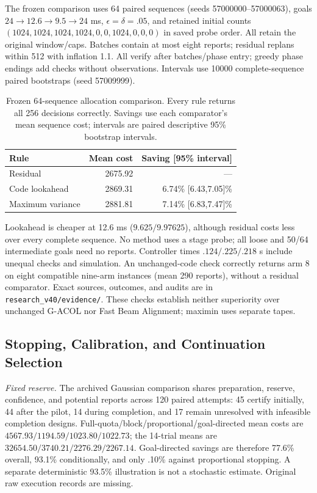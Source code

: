 The frozen comparison uses 64 paired sequences (seeds 57000000--57000063), goals $24\to12.6\to9.5\to24$ ms, $\epsilon=\delta=.05$, and retained initial counts $(1024,1024,1024,1024,0,0,1024,0,0,0)$ in saved probe order. All retain the original window/caps. Batches contain at most eight reports; residual replans within 512 with inflation 1.1. All verify after batches/phase entry; greedy phase endings add checks without observations. Intervals use 10000 complete-sequence paired bootstraps (seed 57009999).

\begin{table}[t]
\centering\small
\caption{Frozen 64-sequence allocation comparison. Every rule returns all 256 decisions correctly. Savings use each comparator's mean sequence cost; intervals are paired descriptive 95\% bootstrap intervals.}
\label{tab:allocation-replication-cost}
\label{tab:allocation-replication-savings}
\setlength{\tabcolsep}{3pt}
\begin{tabular}{@{}lrr@{}}
\toprule
Rule & Mean cost & Saving [95\% interval]\\
\midrule
Residual &2675.92&---\\
Code lookahead &2869.31&6.74\% [6.43,7.05]\%\\
Maximum variance &2881.81&7.14\% [6.83,7.47]\%\\
\bottomrule
\end{tabular}
\end{table}
Lookahead is cheaper at 12.6 ms ($9.625/9.97625$), although residual costs less over every complete sequence. No method uses a stage probe; all loose and 50/64 intermediate goals need no reports. Controller times $.124/.225/.218$ s include unequal checks and simulation. An unchanged-code check correctly returns arm 8 on eight compatible nine-arm instances (mean 290 reports), without a residual comparator. Exact sources, outcomes, and audits are in \texttt{research\_v40/evidence/}. These checks establish neither superiority over unchanged G-ACOL nor Fast Beam Alignment; maximin uses separate tapes.

\subsection{Stopping, Calibration, and Continuation Selection}
\label{app:execution-saving}
\emph{Fixed reserve.} The archived Gaussian comparison shares preparation, reserve, confidence, and potential reports across 120 paired attempts: 45 certify initially, 44 after the pilot, 14 during completion, and 17 remain unresolved with infeasible completion designs. Full-quota/block/proportional/goal-directed mean costs are $4567.93/1194.59/1023.80/1022.73$; the 14-trial means are $32654.50/3740.21/2276.29/2267.14$. Goal-directed savings are therefore 77.6\% overall, 93.1\% conditionally, and only .10\% against proportional stopping. A separate deterministic 93.5\% illustration is not a stochastic estimate. Original raw execution records are missing.

